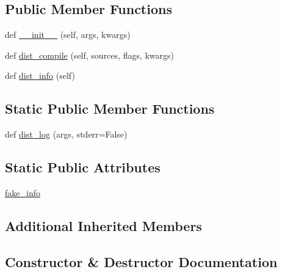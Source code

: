 \subsection*{Public Member Functions}
\begin{DoxyCompactItemize}
\item 
def \hyperlink{classnumpy_1_1distutils_1_1tests_1_1test__ccompiler__opt__conf_1_1FakeCCompilerOpt_af551b02b987f7767c134da02dbb03879}{\+\_\+\+\_\+init\+\_\+\+\_\+} (self, args, kwargs)
\item 
def \hyperlink{classnumpy_1_1distutils_1_1tests_1_1test__ccompiler__opt__conf_1_1FakeCCompilerOpt_a277f76d35c599f5d72a7dbebe9b0ed87}{dist\+\_\+compile} (self, sources, flags, kwargs)
\item 
def \hyperlink{classnumpy_1_1distutils_1_1tests_1_1test__ccompiler__opt__conf_1_1FakeCCompilerOpt_af6b617c84b0508c9c2b030d75c586b70}{dist\+\_\+info} (self)
\end{DoxyCompactItemize}
\subsection*{Static Public Member Functions}
\begin{DoxyCompactItemize}
\item 
def \hyperlink{classnumpy_1_1distutils_1_1tests_1_1test__ccompiler__opt__conf_1_1FakeCCompilerOpt_af6192c52e0673788a5213942a88db165}{dist\+\_\+log} (args, stderr=False)
\end{DoxyCompactItemize}
\subsection*{Static Public Attributes}
\begin{DoxyCompactItemize}
\item 
\hyperlink{classnumpy_1_1distutils_1_1tests_1_1test__ccompiler__opt__conf_1_1FakeCCompilerOpt_abc85147c9fe64c059474c6c7f496d532}{fake\+\_\+info}
\end{DoxyCompactItemize}
\subsection*{Additional Inherited Members}


\subsection{Constructor \& Destructor Documentation}
\mbox{\label{classnumpy_1_1distutils_1_1tests_1_1test__ccompiler__opt__conf_1_1FakeCCompilerOpt_af551b02b987f7767c134da02dbb03879}} 
